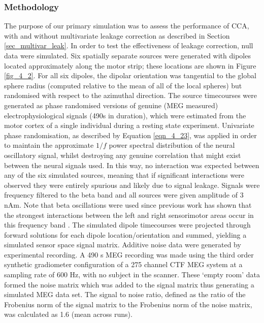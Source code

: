 \subsubsection{Methodology} \label{subaec_sim_method}
The purpose of our primary simulation was to assess the performance of CCA, with and without multivariate leakage correction as described in Section \ref{sec_multivar_leak}. In order to test the effectiveness of leakage correction, null data were simulated. Six spatially separate sources were generated with dipoles located approximately along the motor strip; these locations are shown in Figure \ref{fig_4_2}. For all six dipoles, the dipolar orientation was tangential to the global sphere radius (computed relative to the mean of all of the local spheres) but randomised with respect to the azimuthal direction. The source timecourses were generated as phase randomised versions of genuine (MEG measured) electrophysiological signals (490s in duration), which were estimated from the motor cortex of a single individual during a resting state experiment. Univariate phase randomisation, as described by Equation \ref{eqn_4_23}, was applied in order to maintain the approximate $1/f$ power spectral distribution of the neural oscillatory signal, whilst destroying any genuine correlation that might exist between the neural signals used. In this way, no interaction was expected between any of the six simulated sources, meaning that if significant interactions were observed they were entirely spurious and likely due to signal leakage. Signals were frequency filtered to the beta band and all sources were given amplitude of 3 nAm. Note that beta oscillations were used since previous work has shown that the strongest interactions between the left and right sensorimotor areas occur in this frequency band \citep{Brookes2011a}. The simulated dipole timecourses were projected through forward solutions for each dipole location/orientation and summed, yielding a simulated sensor space signal matrix. Additive noise data were generated by experimental recording. A 490 s MEG recording was made using the third order synthetic gradiometer configuration of a 275 channel CTF MEG system at a sampling rate of 600 Hz, with no subject in the scanner. These ‘empty room’ data formed the noise matrix which was added to the signal matrix thus generating a simulated MEG data set. The signal to noise ratio, defined as the ratio of the Frobenius norm of the signal matrix to the Frobenius norm of the noise matrix, was calculated as 1.6 (mean across runs). 

